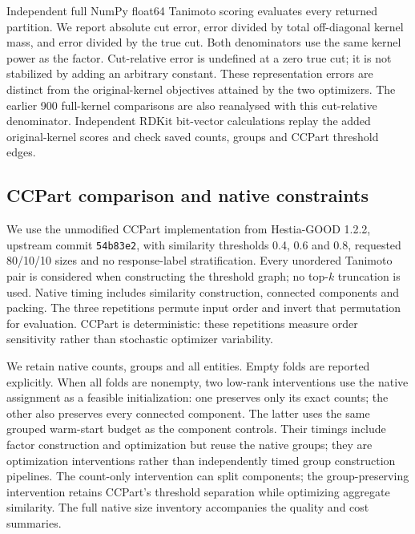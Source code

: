 Independent full NumPy float64 Tanimoto scoring evaluates every returned
partition. We report absolute cut error, error divided by total off-diagonal
kernel mass, and error divided by the true cut. Both denominators use the same
kernel power as the factor. Cut-relative error is undefined at a zero true cut;
it is not stabilized by adding an arbitrary constant. These representation
errors are distinct from the original-kernel objectives attained by the two
optimizers. The earlier 900 full-kernel comparisons are also reanalysed with
this cut-relative denominator. Independent RDKit bit-vector calculations
replay the added original-kernel scores and check saved counts, groups and
CCPart threshold edges.

\subsection{CCPart comparison and native constraints}

We use the unmodified CCPart implementation from Hestia-GOOD 1.2.2, upstream
commit \texttt{54b83e2}, with similarity thresholds 0.4, 0.6 and 0.8, requested
80/10/10 sizes and no response-label stratification. Every unordered Tanimoto
pair is considered when constructing the threshold graph; no top-$k$ truncation
is used. Native timing includes similarity construction, connected components
and packing. The three repetitions permute input order and invert that
permutation for evaluation. CCPart is deterministic: these repetitions measure
order sensitivity rather than stochastic optimizer variability.

We retain native counts, groups and all entities. Empty folds are reported
explicitly. When all folds are nonempty, two low-rank interventions use the
native assignment as a feasible initialization: one preserves only its exact
counts; the other also preserves every connected component. The latter uses
the same grouped warm-start budget as the component controls. Their timings
include factor construction and optimization but reuse the native groups;
they are optimization interventions rather than independently timed group
construction pipelines. The count-only intervention can split components;
the group-preserving intervention retains CCPart's threshold separation while
optimizing aggregate similarity. The full native size inventory accompanies
the quality and cost summaries.
